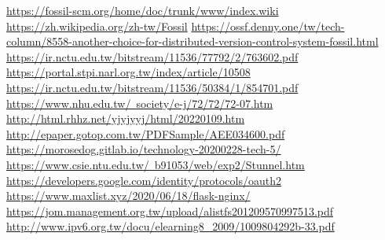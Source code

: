 \renewcommand\bibname{參考文獻}
\begin{thebibliography}{99}
\href{https://fossil-scm.org/home/doc/trunk/www/index.wiki}{https://fossil-scm.org/home/doc/trunk/www/index.wiki}
\href{https://zh.wikipedia.org/zh-tw/Fossil}{https://zh.wikipedia.org/zh-tw/Fossil}
\href{https://ossf.denny.one/tw/tech-column/8558-another-choice-for-distributed-version-control-system-fossil.html}{https://ossf.denny.one/tw/tech-column/8558-another-choice-for-distributed-version-control-system-fossil.html}
\href{https://ir.nctu.edu.tw/bitstream/11536/77792/2/763602.pdf}{https://ir.nctu.edu.tw/bitstream/11536/77792/2/763602.pdf}
\href{https://portal.stpi.narl.org.tw/index/article/10508}{https://portal.stpi.narl.org.tw/index/article/10508}
\href{https://ir.nctu.edu.tw/bitstream/11536/50384/1/854701.pdf}{https://ir.nctu.edu.tw/bitstream/11536/50384/1/854701.pdf}
\href{https://www.nhu.edu.tw/~society/e-j/72/72/72-07.htm}{https://www.nhu.edu.tw/~society/e-j/72/72/72-07.htm}
\href{http://html.rhhz.net/yjyjyyj/html/20220109.htm}{http://html.rhhz.net/yjyjyyj/html/20220109.htm}
\href{http://epaper.gotop.com.tw/PDFSample/AEE034600.pdf}{http://epaper.gotop.com.tw/PDFSample/AEE034600.pdf}
\href{https://morosedog.gitlab.io/technology-20200228-tech-5/}{https://morosedog.gitlab.io/technology-20200228-tech-5/}
\href{https://www.csie.ntu.edu.tw/~b91053/web/exp2/Stunnel.htm}{https://www.csie.ntu.edu.tw/~b91053/web/exp2/Stunnel.htm}
\href{https://developers.google.com/identity/protocols/oauth2}{https://developers.google.com/identity/protocols/oauth2}
\href{https://www.maxlist.xyz/2020/06/18/flask-nginx/}{https://www.maxlist.xyz/2020/06/18/flask-nginx/}
\href{https://jom.management.org.tw/upload/alistfs201209570997513.pdf}{https://jom.management.org.tw/upload/alistfs201209570997513.pdf}
\href{http://www.ipv6.org.tw/docu/elearning8\_2009/1009804292b-33.pdf}{http://www.ipv6.org.tw/docu/elearning8\_2009/1009804292b-33.pdf}

\end{thebibliography}

